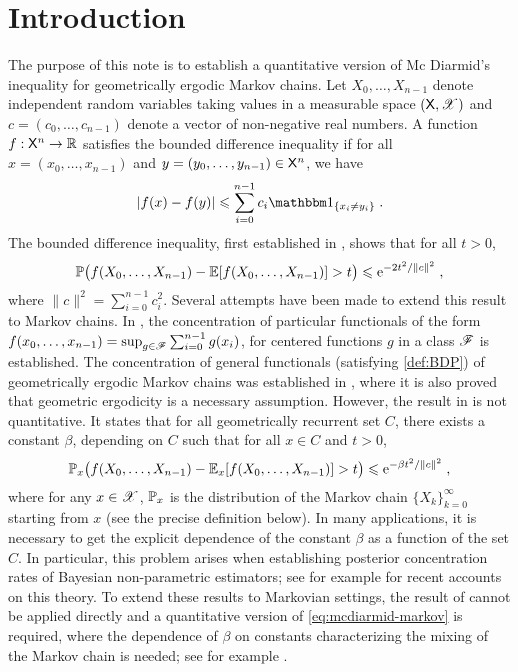 \documentclass[leqno,11pt,a4paper]{article}
\begin{document}
\section{Introduction}
The purpose of this note is to establish a quantitative version of Mc Diarmid's inequality for geometrically ergodic Markov chains.
Let $X_0,\ldots,X_{n-1}$ denote independent random variables taking values in a measurable space $(\mathsf{X},\mathscr{X})$ and $c=(c_0,\ldots,c_{n-1})$ denote a vector of non-negative real numbers. A function  $f:\mathsf{X}^n\to\mathbb{R}$ satisfies the bounded difference inequality if for all $x=(x_0,\ldots,x_{n-1})$ and
$y=(y_0,\ldots,y_{n-1})\in \mathsf{X}^{n}$, we have
\begin{equation}\label{def:BDP}
|f(x)-f(y)|\leqslant \sum_{i=0}^{n-1}c_i\indiacc{x_i\ne y_i}\eqsp.
\end{equation}
The bounded difference inequality, first established in \cite{MR1036755}, shows that for all $t > 0$,
\[
\mathbb{P}\big(f(X_0,\ldots,X_{n-1})-\mathbb{E}[f(X_0,\ldots,X_{n-1})]>t\big)\leqslant \mathrm{e}^{-2t^2/\|c\|^2}\;,
\]
where $\|c\|^2=\sum_{i=0}^{n-1}c_i^2$.
Several attempts have been made to extend this result to Markov chains.
In \cite{MR2424985}, the concentration of particular functionals of the form $f(x_0,\ldots,x_{n-1})=\sup_{g\in \mathscr{F}}\sum_{i=0}^{n-1}g(x_i)$, for centered functions $g$ in a class $\mathscr{F}$ is established.
The concentration of general functionals (satisfying \eqref{def:BDP}) of geometrically ergodic Markov chains was established in \cite{MR3407208}, where it is also proved that geometric ergodicity is a necessary assumption. However, the result in \cite{MR3407208} is not quantitative.
It states that for all geometrically recurrent set $C$, there exists a constant $\beta$, depending on $C$ such that for all $x \in C$ and $t > 0$,
\begin{equation}
\label{eq:mcdiarmid-markov}
\mathbb{P}_x\big(f(X_0,\ldots,X_{n-1})-\mathbb{E}_x[f(X_0,\ldots,X_{n-1})]>t\big)\leqslant \mathrm{e}^{-\beta t^2/\|c\|^2}\;,
\end{equation}
where for any $x\in\mathscr{X}$, $\mathbb{P}_x$ is the distribution of the Markov chain $\{X_k\}_{k=0}^\infty$ starting from $x$ (see the precise definition below).
In many  applications, it is necessary to get the explicit dependence of the constant $\beta$ as a function of the set $C$.
In particular, this problem arises when establishing posterior concentration rates of Bayesian non-parametric estimators; see for example \cite{rousseau:2016,ghosal:vandervaart:2017} for recent accounts on this theory.
To extend these results to Markovian settings, the result of \cite{MR3407208} cannot be applied directly and a quantitative version of  \eqref{eq:mcdiarmid-markov} is required, where the dependence of $\beta$ on constants characterizing the mixing of the Markov chain is needed; see for example \cite{vernet:2015,lecorff:lerasle:vernet:2018}.
\end{document}
